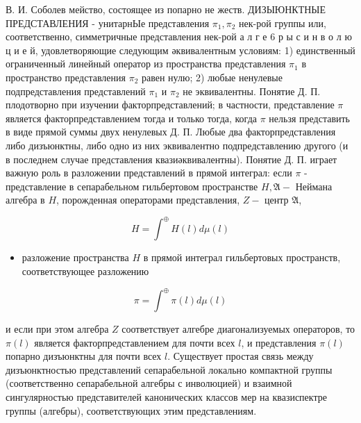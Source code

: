 \documentclass[10pt]{article}
\begin{document}
В. И. Соболев мейство, состоящее из попарно не жеств. ДИЗЫЮНКТНЫЕ ПРЕДСТАВЛЕНИЯ - унитарнЫе представления $\pi_{1}, \pi_{2}$ нек-рой группы или, соответственно, симметричные представления нек-рой а л г е 6 р ы с и н в о л ю ц и е й, удовлетворяющие следующим әквивалентным условиям: 1) единственный ограниченный линейный оператор из пространства представления $\pi_{1}$ в пространство представления $\pi_{2}$ равен нулю; 2) любые ненулевые подпредставления представлений $\pi_{1}$ и $\pi_{2}$ не эквивалентны. Понятие Д. П. плодотворно при изучении факторпредставлений; в частности, представление $\pi$ является факторпредставлением тогда и только тогда, когда $\pi$ нельзя представить в виде прямой суммы двух ненулевых Д. П. Любые два факторпредставления либо дизъюнктны, либо одно из них эквивалентно подпредставлению другого (и в последнем случае представления квазиәквивалентны). Понятие Д. П. играет важную роль в разложении представлений в прямой интеграл: если $\pi$ - представление в сепарабельном гильбертовом пространстве $H, \mathfrak{A}-$ Неймана алгебра в $H$, порожденная операторами представления, $Z-$ центр $\mathfrak{A}$,



\[

H=\int^{\oplus} H(l) d \mu(l)

\]



\begin{itemize}

  \item разложение пространства $H$ в прямой интеграл гильбертовых пространств, соответствующее разложению

\end{itemize}



\[

\pi=\int^{\oplus} \pi(l) d \mu(l)

\]



и если при этом алгебра $Z$ соответствует алгебре диагонализуемых операторов, то $\pi(l)$ является факторпредставлением для почти всех $l$, и представления $\pi(l)$ попарно дизъюнктны для почти всех $l$. Существует простая связь между дизъюнктностью представлений сепарабельной локально компактной группы (соответственно сепарабельной алгебры с инволюцией) и взаимной сингулярностью представителей канонических классов мер на квазиспектре группы (алгебры), соответствующих этим представлениям.
\end{document}
